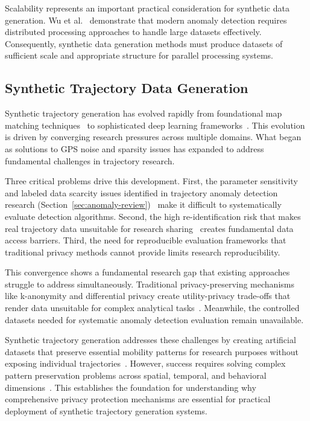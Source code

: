 Scalability represents an important practical consideration for synthetic data generation. Wu et al.~\cite{wuSafetySpatialFeature2024} demonstrate that modern anomaly detection requires distributed processing approaches to handle large datasets effectively. Consequently, synthetic data generation methods must produce datasets of sufficient scale and appropriate structure for parallel processing systems.

\subsection{Synthetic Trajectory Data Generation}
\label{sec:generation-review}

Synthetic trajectory generation has evolved rapidly from foundational map matching techniques~\cite{newsonHiddenMarkovMap2009} to sophisticated deep learning frameworks~\cite{caoGeneratingMobilityTrajectories2021,wangGTGGeneralizableTrajectory2025}. This evolution is driven by converging research pressures across multiple domains. What began as solutions to GPS noise and sparsity issues has expanded to address fundamental challenges in trajectory research.

Three critical problems drive this development. First, the parameter sensitivity and labeled data scarcity issues identified in trajectory anomaly detection research (Section~\ref{sec:anomaly-review})~\cite{zhangIBATDetectingAnomalous2011} make it difficult to systematically evaluate detection algorithms. Second, the high re-identification risk that makes real trajectory data unsuitable for research sharing~\cite{raoCATSConditionalAdversarial2023} creates fundamental data access barriers. Third, the need for reproducible evaluation frameworks that traditional privacy methods cannot provide limits research reproducibility.

This convergence shows a fundamental research gap that existing approaches struggle to address simultaneously. Traditional privacy-preserving mechanisms like k-anonymity and differential privacy create utility-privacy trade-offs that render data unsuitable for complex analytical tasks~\cite{jordonPATEGANGeneratingSynthetic2019}. Meanwhile, the controlled datasets needed for systematic anomaly detection evaluation remain unavailable.

Synthetic trajectory generation addresses these challenges by creating artificial datasets that preserve essential mobility patterns for research purposes without exposing individual trajectories~\cite{caoGeneratingMobilityTrajectories2021}. However, success requires solving complex pattern preservation problems across spatial, temporal, and behavioral dimensions~\cite{kongMobilityTrajectoryGeneration2023,merhiSyntheticTrajectoryGeneration2024}. This establishes the foundation for understanding why comprehensive privacy protection mechanisms are essential for practical deployment of synthetic trajectory generation systems.

